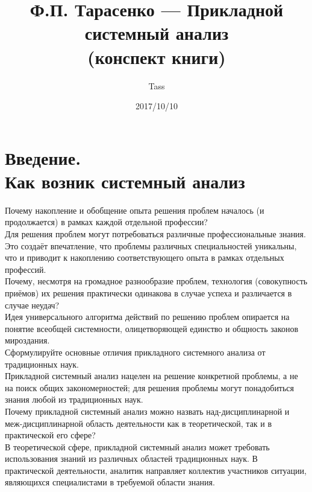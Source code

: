 \documentclass{article}
\begin{document}
\title{Ф.П. Тарасенко --- Прикладной системный анализ\\(конспект книги)}
\author{Tass}
\date{2017/10/10}
\maketitle

\tableofcontents
\newpage

\section*{\flushright Введение.\\Как возник системный анализ}

Почему накопление и обобщение опыта решения проблем началось (и продолжается) в рамках каждой отдельной профессии?
\\
Для решения проблем могут потребоваться различные профессиональные знания. Это создаёт впечатление, что проблемы различных специальностей уникальны, что и приводит к накоплению соответствующего опыта в рамках отдельных профессий.
\\
Почему, несмотря на громадное разнообразие проблем, технология (совокупность приёмов) их решения практически одинакова в случае успеха и различается в случае неудач?
\\
Идея универсального алгоритма действий по решению проблем опирается на понятие всеобщей системности, олицетворяющей единство и общность законов мироздания.
\\
Сформулируйте основные отличия прикладного системного анализа от традиционных наук.
\\
Прикладной системный анализ нацелен на решение конкретной проблемы, а не на поиск общих закономерностей; для решения проблемы могут понадобиться знания любой из традиционных наук.
\\
Почему прикладной системный анализ можно назвать над-дисциплинарной и меж-дисциплинарной область деятельности как в теоретической, так и в практической его сфере?
\\
В теоретической сфере, прикладной системный анализ может требовать использования знаний из различных областей традиционных наук. В практической деятельности, аналитик направляет коллектив участников ситуации, являющихся специалистами в требуемой области знания.
\end{document}
